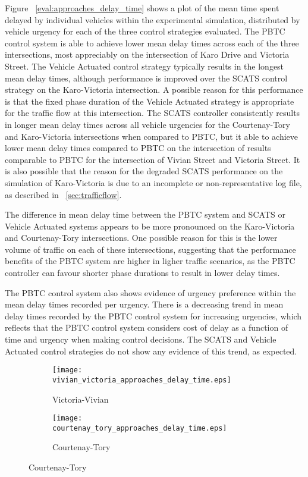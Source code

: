 {Figure ~\ref{eval:approaches_delay_time} shows a plot of the mean time spent delayed by individual vehicles within the experimental simulation, distributed by vehicle urgency for each of the three control strategies evaluated. The PBTC control system is able to achieve lower mean delay times across each of the three intersections, most appreciably on the intersection of Karo Drive and Victoria Street. The Vehicle Actuated control strategy typically results in the longest mean delay times, although performance is improved over the SCATS control strategy on the Karo-Victoria intersection. A possible reason for this performance is that the fixed phase duration of the Vehicle Actuated strategy is appropriate for the traffic flow at this intersection. The SCATS controller consistently results in longer mean delay times across all vehicle urgencies for the Courtenay-Tory and Karo-Victoria intersections when compared to PBTC, but it able to achieve lower mean delay times compared to PBTC on the intersection of results comparable to PBTC for the intersection of Vivian Street and Victoria Street. It is also possible that the reason for the degraded SCATS performance on the simulation of Karo-Victoria is due to an incomplete or non-representative log file, as described in ~\ref{sec:trafficflow}. 

The difference in mean delay time between the PBTC system and SCATS or Vehicle Actuated systems appears to be more pronounced on the Karo-Victoria and Courtenay-Tory intersections. One possible reason for this is the lower volume of traffic on each of these intersections, suggesting that the performance benefits of the PBTC system are higher in ligher traffic scenarios, as the PBTC controller can favour shorter phase durations to result in lower delay times. 

The PBTC control system also shows evidence of urgency preference within the mean delay times recorded per urgency. There is a decreasing trend in mean delay times recorded by the PBTC control system for increasing urgencies, which reflects that the PBTC control system considers cost of delay as a function of time and urgency when making control decisions. The SCATS and Vehicle Actuated control strategies do not show any evidence of this trend, as expected.

\begin{figure}
\centering
\begin{subfigure}{.5\textwidth}
  \centering
  \texttt{[image: vivian\_victoria\_approaches\_delay\_time.eps]}
  \caption{Victoria-Vivian}
  \label{approaches_delay_time:sub1}
\end{subfigure}%
\begin{subfigure}{.5\textwidth}
  \centering
  \texttt{[image: courtenay\_tory\_approaches\_delay\_time.eps]}
  \caption{Courtenay-Tory}
  \label{approaches_delay_time:sub2}
\end{subfigure}


\end{figure}}
